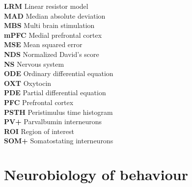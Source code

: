\documentclass[12pt, a4paper]{report}
\begin{document}
\noindent
\textbf{LRM} Linear resistor model \\

\noindent
\textbf{MAD} Median absolute deviation \\

\noindent
\textbf{MBS} Multi brain stimulation \\

\noindent
\textbf{mPFC} Medial prefrontal cortex \\

\noindent
\textbf{MSE} Mean squared error \\

\noindent
\textbf{NDS} Normalized David's score \\

\noindent
\textbf{NS} Nervous system \\

\noindent
\textbf{ODE} Ordinary differential equation \\

\noindent
\textbf{OXT} Oxytocin \\

\noindent
\textbf{PDE} Partial differential equation \\

\noindent
\textbf{PFC} Prefrontal cortex \\

\noindent
\textbf{PSTH} Peristimulus time histogram \\

\noindent
\textbf{PV+} Parvalbumin interneurons \\

\noindent
\textbf{ROI} Region of interest \\

\noindent
\textbf{SOM+} Somatostating interneurons \\







\listoffigures

\listoftables

\tableofcontents
	
\newpage
	
	
	
	\chapter{Neurobiology of behaviour} 
	
\end{document}
